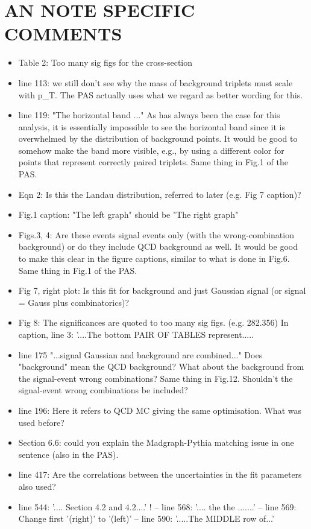 \documentclass[paper=a4, fontsize=11pt]{scrartcl}
\begin{document}
\section{AN NOTE SPECIFIC COMMENTS}
\begin{itemize}
\item Table 2: Too many sig figs for the cross-section

\item line 113: we still don't see why the mass of background triplets must scale with p\_T. The PAS actually uses what we regard as better wording for this.

\item line 119: "The horizontal band ..." As has always been the case for this analysis, it is essentially impossible to see the horizontal band since it is overwhelmed by the distribution of background points. It would be good to somehow make the band more visible, e.g., by using a different color for points that represent correctly paired triplets. Same thing in Fig.1 of the PAS.

\item Eqn 2: Is this the Landau distribution, referred to later (e.g. Fig 7 caption)? \item Fig.1 caption: "The left graph" should be "The right graph"

\item Figs.3, 4: Are these events signal events only (with the wrong-combination background) or do they include QCD background as well. It would be good to make this clear in the figure captions, similar to what is done in Fig.6. Same thing in Fig.1 of the PAS.

\item Fig 7, right plot: Is this fit for background and just Gaussian signal (or signal = Gauss plus combinatorics)?

\item Fig 8: The significances are quoted to too many sig figs. (e.g. 282.356) In caption, line 3: '....The bottom PAIR OF TABLES represent.....

\item line 175 "...signal Gaussian and background are combined..." Does "background" mean the QCD background? What about the background from the signal-event wrong combinations? Same thing in Fig.12. Shouldn't the signal-event wrong combinations be included?

\item line 196: Here it refers to QCD MC giving the same optimisation. What was used before?

\item Section 6.6: could you explain the Madgraph-Pythia matching issue in one sentence (also in the PAS).

\item line 417: Are the correlations between the uncertainties in the fit parameters also used?

\item line 544: '.... Section 4.2 and 4.2....' ! -- line 568: '.... the the .......' -- line 569: Change first '(right)' to '(left)' -- line 590: '.....The MIDDLE row of...'
\end{itemize}
\end{document}
